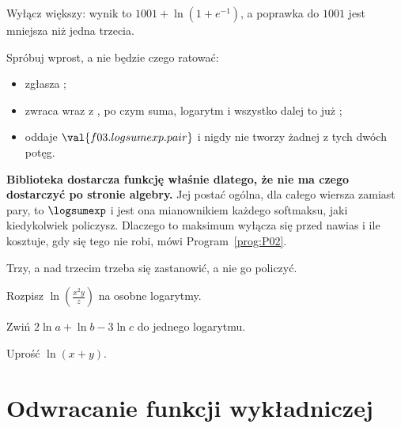 \begin{fr}
Wyłącz większy: wynik to $1001 + \ln\!\left(1 + e^{-1}\right)$, a poprawka do
$1001$ jest mniejsza niż jedna trzecia.

\begin{aibox}
Spróbuj wprost, a nie będzie czego ratować:

\begin{itemize}
\item {} zgłasza ;
\item {} zwraca  wraz z
  , po czym suma, logarytm i
  wszystko dalej to już ;
\item {} oddaje $\val{f03.logsumexp.pair}$ i
  nigdy nie tworzy żadnej z tych dwóch potęg.
\end{itemize}

\textbf{Biblioteka dostarcza funkcję właśnie dlatego, że nie ma czego
dostarczyć po stronie algebry.} Jej postać ogólna, dla całego wiersza zamiast
pary, to $\logsumexp$ i jest ona mianownikiem każdego softmaksu, jaki
kiedykolwiek policzysz. Dlaczego to maksimum wyłącza się przed nawias i ile
kosztuje, gdy się tego nie robi, mówi Program~\ref{prog:P02}.
\end{aibox}
\end{fr}


\begin{fr}
\yourturn
Trzy, a nad trzecim trzeba się zastanowić, a nie go policzyć.

Rozpisz $\ln\!\left(\frac{x^{2} y}{z}\right)$ na osobne logarytmy.

Zwiń $2\ln a + \ln b - 3\ln c$ do jednego logarytmu.

Uprość $\ln(x + y)$.
\dotline
\nextframe
\end{fr}

\section{Odwracanie funkcji wykładniczej}
\label{sec:F03-undoing}

